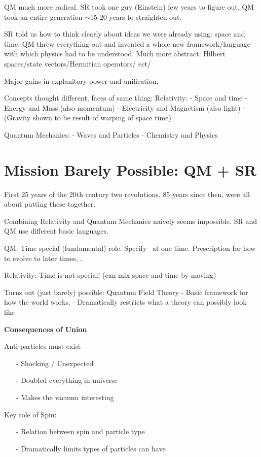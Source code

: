 QM much more radical. 
SR took one guy (Einstein) few years to figure out. 
QM took an entire generation $\sim$15-20 years to straighten out. 

SR told us how to think clearly about ideas we were already using: space and time. 
QM threw everything out and invented a whole new framework/language with which physics had to be understood.
Much more abstract: Hilbert spaces/state vectors/Hermitian operators/ ect/

Major gains in explanitory power and unification.

Concepts thought different, faces of same thing:
Relativity:
- Space and time
- Energy and Mass (also momentum)
- Electricity and Magnetism (also light)
- (Gravity shown to be result of warping of space time)

Quantum Mechanics:
- Waves and Particles
- Chemistry and Physics

\section{Mission Barely Possible: QM + SR}
First 25 years of the 20th century two revolutions.
85 years since then, were all about putting these together.

Combining Relativity and Quantum Mechanics naively seems impossible. 
SR and QM use different basic languages. 

QM: Time special (fundamental) role. Specify \ketY\ at one time. Prescription for how to evolve to later times,
.

Relativity: Time is not special! (can mix space and time by moving)

Turns out (just barely) possible: Quantum Field Theory 
- Basic framework for how the world works.
- Dramatically restricts what a theory can possibly look like


\textbf{Consequences of Union}

Anti-particles must exist
\begin{itemize}
\item[-] Shocking / Unexpected
\item[-] Doubled everything in universe 
\item[-] Makes the vacuum interesting
\end{itemize}

Key role of Spin:
\begin{itemize}
\item[-] Relation between spin and particle type
\item[-] Dramatically limits types of particles can have
\end{itemize}

